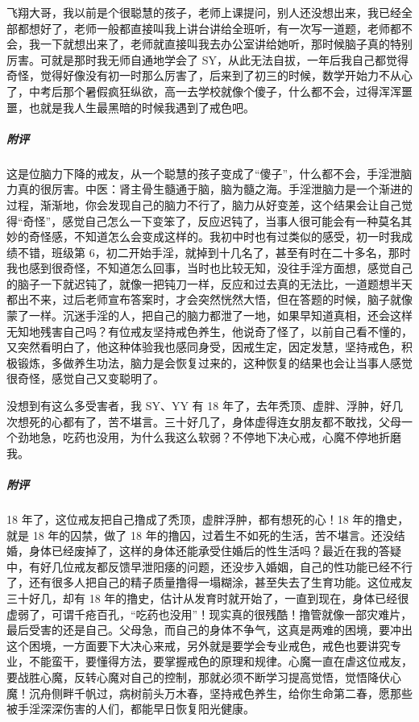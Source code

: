\begin{case}
    飞翔大哥，我以前是个很聪慧的孩子，老师上课提问，别人还没想出来，我已经全部都想好了，老师一般都直接叫我上讲台讲给全班听，有一次写一道题，老师都不会，我一下就想出来了，老师就直接叫我去办公室讲给她听，那时候脑子真的特别厉害。可就是那时我无师自通地学会了 SY，从此无法自拔，一年后我自己都觉得奇怪，觉得好像没有初一时那么厉害了，后来到了初三的时候，数学开始力不从心了，中考后那个暑假疯狂纵欲，高一去学校就像个傻子，什么都不会，过得浑浑噩噩，也就是我人生最黑暗的时候我遇到了戒色吧。
    \subparagraph{附评} 这是位脑力下降的戒友，从一个聪慧的孩子变成了“傻子”，什么都不会，手淫泄脑力真的很厉害。中医：肾主骨生髓通于脑，脑为髓之海。手淫泄脑力是一个渐进的过程，渐渐地，你会发现自己的脑力不行了，脑力从好变差，这个结果会让自己觉得“奇怪”，感觉自己怎么一下变笨了，反应迟钝了，当事人很可能会有一种莫名其妙的奇怪感，不知道怎么会变成这样的。我初中时也有过类似的感受，初一时我成绩不错，班级第 6，初二开始手淫，就掉到十几名了，甚至有时在二十多名，那时我也感到很奇怪，不知道怎么回事，当时也比较无知，没往手淫方面想，感觉自己的脑子一下就迟钝了，就像一把钝刀一样，反应和过去真的无法比，一道题想半天都出不来，过后老师宣布答案时，才会突然恍然大悟，但在答题的时候，脑子就像蒙了一样。沉迷手淫的人，把自己的脑力都泄了一地，如果早知道真相，还会这样无知地残害自己吗？有位戒友坚持戒色养生，他说奇了怪了，以前自己看不懂的，又突然看明白了，他这种体验我也感同身受，因戒生定，因定发慧，坚持戒色，积极锻炼，多做养生功法，脑力是会恢复过来的，这种恢复的结果也会让当事人感觉很奇怪，感觉自己又变聪明了。
\end{case}

\begin{case}
    没想到有这么多受害者，我 SY、YY 有 18 年了，去年秃顶、虚胖、浮肿，好几次想死的心都有了，苦不堪言。三十好几了，身体虚得连女朋友都不敢找，父母一个劲地急，吃药也没用，为什么我这么软弱？不停地下决心戒，心魔不停地折磨我。
    \subparagraph{附评} 18 年了，这位戒友把自己撸成了秃顶，虚胖浮肿，都有想死的心！18 年的撸史，就是 18 年的囚禁，做了 18 年的撸囚，过着生不如死的生活，苦不堪言。还没结婚，身体已经废掉了，这样的身体还能承受住婚后的性生活吗？最近在我的答疑中，有好几位戒友都反馈早泄阳痿的问题，还没步入婚姻，自己的性功能已经不行了，还有很多人把自己的精子质量撸得一塌糊涂，甚至失去了生育功能。这位戒友三十好几，却有 18 年的撸史，估计从发育时就开始了，一直到现在，身体已经很虚弱了，可谓千疮百孔，“吃药也没用”！现实真的很残酷！撸管就像一部灾难片，最后受害的还是自己。父母急，而自己的身体不争气，这真是两难的困境，要冲出这个困境，一方面要下大决心来戒，另外就是要学会专业戒色，戒色也要讲究专业，不能蛮干，要懂得方法，要掌握戒色的原理和规律。心魔一直在虐这位戒友，要战胜心魔，反转心魔对自己的控制，那就必须不断学习提高觉悟，觉悟降伏心魔！沉舟侧畔千帆过，病树前头万木春，坚持戒色养生，给你生命第二春，愿那些被手淫深深伤害的人们，都能早日恢复阳光健康。
\end{case}

